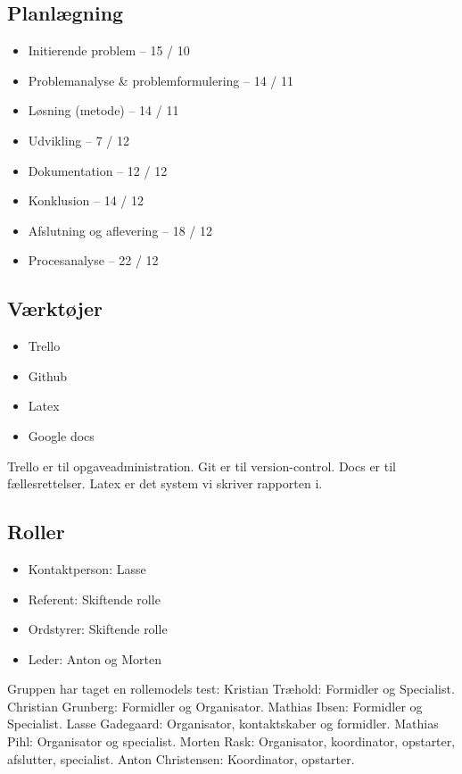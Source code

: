 \documentclass[oneside,a4paper,titlepage]{article}
\begin{document}
\subsection*{Planlægning}
\begin{itemize}
  \item Initierende problem – 15 / 10
  \item Problemanalyse \& problemformulering – 14 / 11
  \item Løsning (metode) – 14 / 11
  \item Udvikling – 7 / 12
  \item Dokumentation – 12 / 12
  \item Konklusion – 14 / 12
  \item Afslutning og aflevering – 18 / 12
  \item Procesanalyse – 22 / 12
\end{itemize}

\subsection*{Værktøjer}
\begin{itemize}
  \item Trello
  \item Github
  \item Latex
  \item Google docs
\end{itemize}
Trello er til opgaveadministration.
Git er til version-control.
Docs er til fællesrettelser.
Latex er det system vi skriver rapporten i.
\subsection*{Roller}
\begin{itemize}
  \item Kontaktperson: Lasse
  \item Referent: Skiftende rolle
  \item Ordstyrer: Skiftende rolle
  \item Leder: Anton og Morten
\end{itemize}
Gruppen har taget en rollemodels test: \newline
Kristian Træhold: Formidler og Specialist. \newline
Christian Grunberg: Formidler og Organisator.\newline
Mathias Ibsen: Formidler og Specialist.\newline
Lasse Gadegaard: Organisator, kontaktskaber og formidler.\newline
Mathias Pihl: Organisator og specialist.\newline
Morten Rask: Organisator, koordinator, opstarter, afslutter, specialist.\newline
Anton Christensen: Koordinator, opstarter.\newline
\end{document}
